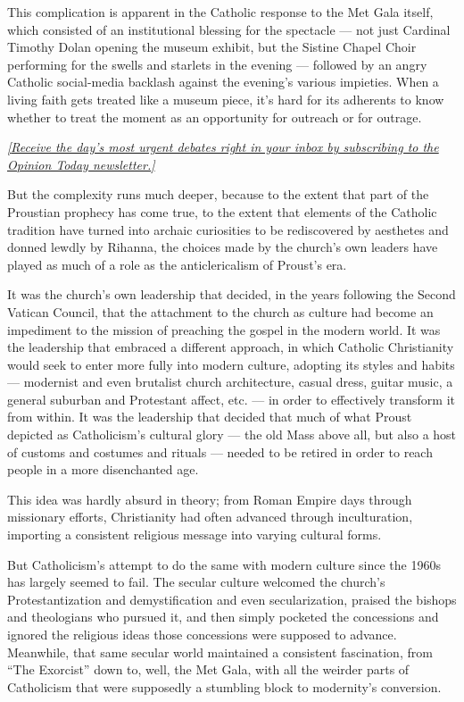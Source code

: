 This complication is apparent in the Catholic response to the Met Gala
itself, which consisted of an institutional blessing for the spectacle
--- not just Cardinal Timothy Dolan opening the museum exhibit, but the
Sistine Chapel Choir performing for the swells and starlets in the
evening --- followed by an angry Catholic social-media backlash against
the evening's various impieties. When a living faith gets treated like a
museum piece, it's hard for its adherents to know whether to treat the
moment as an opportunity for outreach or for outrage.

\href{https://www.nytimes3xbfgragh.onion/newsletters/opiniontoday?action=click\&module=Intentional\&pgtype=Article}{\emph{{[}Receive
the day's most urgent debates right in your inbox by subscribing to the
Opinion Today newsletter.{]}}}

But the complexity runs much deeper, because to the extent that part of
the Proustian prophecy has come true, to the extent that elements of the
Catholic tradition have turned into archaic curiosities to be
rediscovered by aesthetes and donned lewdly by Rihanna, the choices made
by the church's own leaders have played as much of a role as the
anticlericalism of Proust's era.

It was the church's own leadership that decided, in the years following
the Second Vatican Council, that the attachment to the church as culture
had become an impediment to the mission of preaching the gospel in the
modern world. It was the leadership that embraced a different approach,
in which Catholic Christianity would seek to enter more fully into
modern culture, adopting its styles and habits --- modernist and even
brutalist church architecture, casual dress, guitar music, a general
suburban and Protestant affect, etc. --- in order to effectively
transform it from within. It was the leadership that decided that much
of what Proust depicted as Catholicism's cultural glory --- the old Mass
above all, but also a host of customs and costumes and rituals ---
needed to be retired in order to reach people in a more disenchanted
age.

This idea was hardly absurd in theory; from Roman Empire days through
missionary efforts, Christianity had often advanced through
inculturation, importing a consistent religious message into varying
cultural forms.

But Catholicism's attempt to do the same with modern culture since the
1960s has largely seemed to fail. The secular culture welcomed the
church's Protestantization and demystification and even secularization,
praised the bishops and theologians who pursued it, and then simply
pocketed the concessions and ignored the religious ideas those
concessions were supposed to advance. Meanwhile, that same secular world
maintained a consistent fascination, from ``The Exorcist'' down to,
well, the Met Gala, with all the weirder parts of Catholicism that were
supposedly a stumbling block to modernity's conversion.

